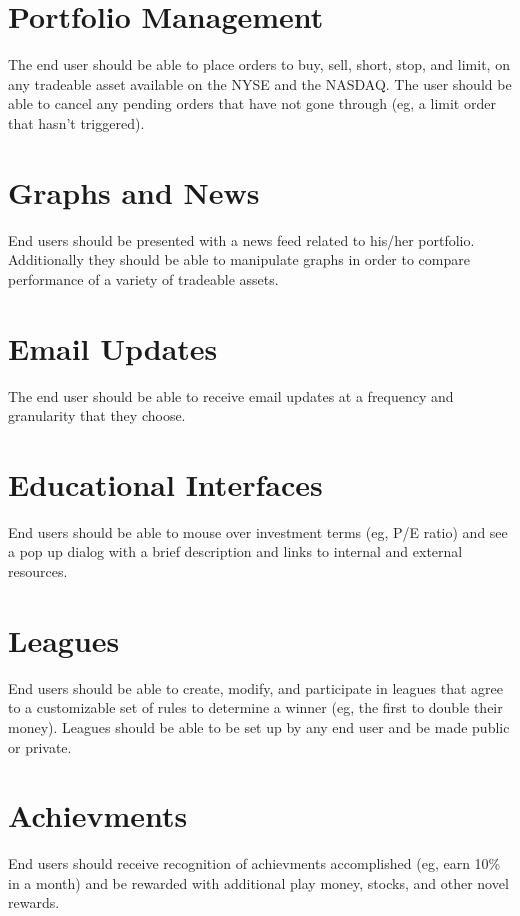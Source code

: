 \documentclass[11pt,letterpaper,oneside]{memoir}
\begin{document}
\section{Portfolio Management}

The end user should be able to place orders to buy, sell, short, stop, and limit, on any
tradeable asset available on the NYSE and the NASDAQ. The user should be able to
cancel any pending orders that have not gone through (eg, a limit order that hasn't triggered).

\section{Graphs and News}

End users should be presented with a news feed related to his/her portfolio.
Additionally they should be able to manipulate graphs in order to compare
performance of a variety of tradeable assets.

\section{Email Updates}

The end user should be able to receive email updates at a frequency and granularity that they choose.

\section{Educational Interfaces}

End users should be able to mouse over investment terms (eg, P/E ratio) and see a pop up
dialog with a brief description and links to internal and external resources.

\section{Leagues}

End users should be able to create, modify, and participate in leagues that agree to a customizable
set of rules to determine a winner (eg, the first to double their money).  Leagues should be able
to be set up by any end user and be made public or private.

\section{Achievments}

End users should receive recognition of achievments accomplished (eg, earn 10\% in a month) and
be rewarded with additional play money, stocks, and other novel rewards.
\end{document}
